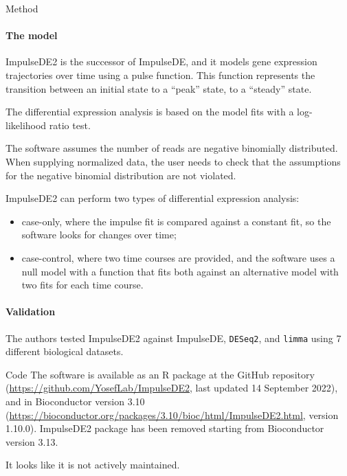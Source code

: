 \documentclass[10pt,a4paper]{article}
\newlength{\templength}
\newenvironment{ann_section}[1]
{\settowidth{\templength}{#1}%
\noindent\textbf{#1}
\hspace{1em}\begin{minipage}[t]{\dimexpr \linewidth-\the\templength-2em}}
{\end{minipage}\par\bigskip}
\begin{document}
\begin{ann_section}{Method}
\paragraph{The model} ImpulseDE2 is the successor of ImpulseDE, and it models gene expression trajectories over time using a pulse function. This function represents the transition between an initial state to a ``peak'' state, to a ``steady'' state.

The differential expression analysis is based on the model fits with a log-likelihood ratio test.

The software assumes the number of reads are negative binomially distributed. When supplying normalized data, the user needs to check that the assumptions for the negative binomial distribution are not violated.

ImpulseDE2 can perform two types of differential expression analysis:
\begin{itemize}
    \item case-only, where the impulse fit is compared against a constant fit, so the software looks for changes over time;
    \item case-control, where two time courses are provided, and the software uses a null model with a function that fits both against an alternative model with two fits for each time course. 
\end{itemize}
\paragraph{Validation} The authors tested ImpulseDE2 against ImpulseDE, \texttt{DESeq2}, and \texttt{limma} using 7 different biological datasets. 
\end{ann_section}

\begin{ann_section}{Code}
The software is available as an R package at the GitHub repository (\url{https://github.com/YosefLab/ImpulseDE2}, last updated 14 September 2022), and in Bioconductor version 3.10 (\url{https://bioconductor.org/packages/3.10/bioc/html/ImpulseDE2.html}, version 1.10.0). ImpulseDE2 package has been removed starting from Bioconductor version 3.13.

It looks like it is not actively maintained.
\end{ann_section}
\end{document}
